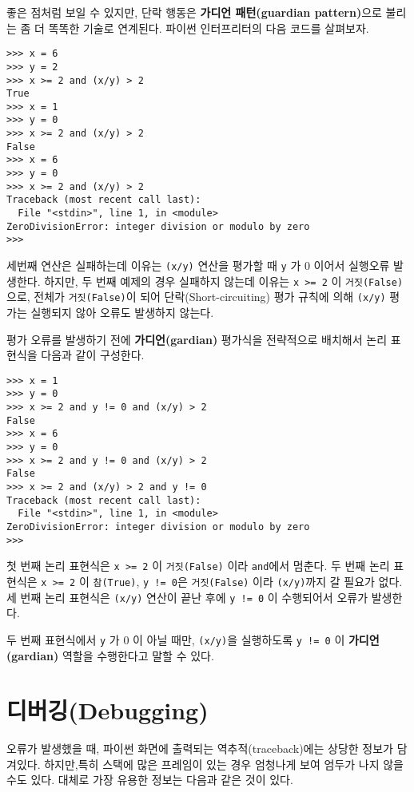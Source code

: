 좋은 점처럼 보일 수 있지만, 단락 행동은 {\bf 가디언 패턴(guardian pattern)}으로 불리는 좀 더 똑똑한 기술로 연계된다.
파이썬 인터프리터의 다음 코드를 살펴보자.

\beforeverb
\begin{verbatim}
>>> x = 6 
>>> y = 2
>>> x >= 2 and (x/y) > 2
True
>>> x = 1 
>>> y = 0
>>> x >= 2 and (x/y) > 2
False
>>> x = 6
>>> y = 0
>>> x >= 2 and (x/y) > 2
Traceback (most recent call last):
  File "<stdin>", line 1, in <module>
ZeroDivisionError: integer division or modulo by zero
>>> 
\end{verbatim}
\afterverb
%

세번째 연산은 실패하는데 이유는 {\tt (x/y)} 연산을 평가할 때 {\tt y} 가 0 이어서 실행오류 발생한다.
하지만, 두 번째 예제의 경우 실패하지 않는데 이유는 {\tt x >= 2} 이 {\tt 거짓(False)} 으로, 
전체가 {\tt 거짓(False)}이 되어 단락(Short-circuiting) 평가 규칙에 의해 {\tt (x/y)} 평가는 실행되지 않아 오류도 발생하지 않는다.

평가 오류를 발생하기 전에 {\bf 가디언(gardian)} 평가식을 전략적으로 배치해서 논리 표현식을 다음과 같이 구성한다. 

\beforeverb
\begin{verbatim}
>>> x = 1
>>> y = 0
>>> x >= 2 and y != 0 and (x/y) > 2
False
>>> x = 6 
>>> y = 0
>>> x >= 2 and y != 0 and (x/y) > 2
False
>>> x >= 2 and (x/y) > 2 and y != 0
Traceback (most recent call last):
  File "<stdin>", line 1, in <module>
ZeroDivisionError: integer division or modulo by zero
>>>
\end{verbatim}
\afterverb
%
첫 번째 논리 표현식은 {\tt x >= 2} 이 {\tt 거짓(False)} 이라 {\tt and}에서 멈춘다.
두 번째 논리 표현식은 {\tt x >= 2} 이 {\tt 참(True)}, {\tt y != 0}은 {\tt 거짓(False)} 이라 {\tt (x/y)}까지 갈 필요가 없다.
세 번째 논리 표현식은 {\tt (x/y)} 연산이 끝난 후에 {\tt y != 0} 이 수행되어서 오류가 발생한다.

두 번째 표현식에서 {\tt y} 가 0 이 아닐 때만, {\tt (x/y)}을 실행하도록 {\tt y != 0} 이 {\bf 가디언(gardian)} 역할을 수행한다고 말할 수 있다.

\section{디버깅(Debugging)}

오류가 발생했을 때, 파이썬 화면에 출력되는 역추적(traceback)에는 상당한 정보가 담겨있다. 
하지만,특히 스택에 많은 프레임이 있는 경우 엄청나게 보여 엄두가 나지 않을 수도 있다.
대체로 가장 유용한 정보는 다음과 같은 것이 있다.

